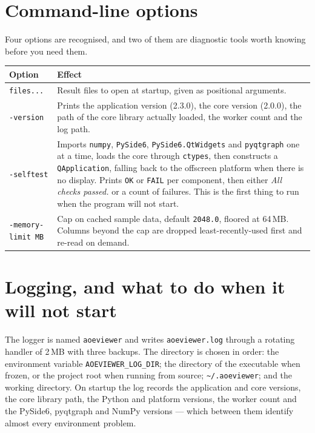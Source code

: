 \documentclass[11pt,a4paper,oneside]{report}
\newcommand{\appver}{2.3.0}
\newcommand{\code}[1]{\texttt{#1}}
\begin{document}
\section{Command-line options}

Four options are recognised, and two of them are diagnostic tools worth knowing
before you need them.

\begin{center}
\small
\begin{tabular}{@{}p{}p{}@{}}
\toprule
\textbf{Option} & \textbf{Effect} \\
\midrule
\code{files...} & Result files to open at startup, given as positional arguments. \\
\addlinespace
\code{-version} & Prints the application version (\appver), the core version
  (2.0.0), the path of the core library actually loaded, the worker count and
  the log path. \\
\addlinespace
\code{-selftest} & Imports \code{numpy}, \code{PySide6},
  \code{PySide6.QtWidgets} and \code{pyqtgraph} one at a time, loads the core
  through \code{ctypes}, then constructs a \code{QApplication}, falling back to
  the offscreen platform when there is no display. Prints \code{OK} or
  \code{FAIL} per component, then either \emph{All checks passed.} or a count of
  failures. This is the first thing to run when the program will not start. \\
\addlinespace
\code{-memory-limit MB} & Cap on cached sample data, default \code{2048.0},
  floored at 64\,MB. Columns beyond the cap are dropped least-recently-used
  first and re-read on demand. \\
\bottomrule
\end{tabular}
\end{center}

\section{Logging, and what to do when it will not start}

The logger is named \code{aoeviewer} and writes \code{aoeviewer.log} through a
rotating handler of 2\,MB with three backups. The directory is chosen in order:
the environment variable \code{AOEVIEWER\_LOG\_DIR}; the directory of the
executable when frozen, or the project root when running from source;
\code{\textasciitilde/.aoeviewer}; and the working directory. On startup the log
records the application and core versions, the core library path, the Python and
platform versions, the worker count and the PySide6, pyqtgraph and NumPy
versions --- which between them identify almost every environment problem.
\end{document}
